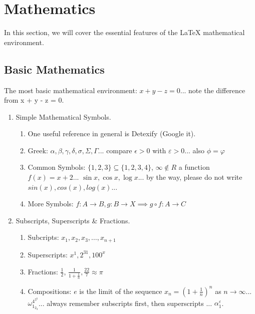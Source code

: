 \documentclass{article}
\begin{document}
    \section{Mathematics}
        In this section, we will cover the essential features of the \LaTeX{} mathematical environment.
        \subsection{Basic Mathematics}
            The most basic mathematical environment: $x + y - z = 0$... note the difference from x + y - z = 0.
            \begin{enumerate}
                \item Simple Mathematical Symbols.
                \begin{enumerate}
                    \item One useful reference in general is Detexify (Google it).
                    \item Greek: $\alpha, \beta, \gamma, \delta,\sigma, \Sigma, \Gamma$... compare $\epsilon > 0$ with $\varepsilon > 0$... also $\phi = \varphi$
                    \item Common Symbols: $\{1, 2, 3\} \subseteq \{1, 2, 3, 4\}$, $\infty \not \in R$ a function $f(x) = x + 2$... $\sin x, \cos x, \log x$... by the way, please do not write $sin(x), cos(x), log(x)$... 
                    \item More Symbols: $f: A \to B, g:B \to X \implies g \circ f : A \to C$
                \end{enumerate}
                \item Subscripts, Superscripts \& Fractions.
                \begin{enumerate}
                    \item Subcripts: $x_{1}, x_{2}, x_{3}, \dots , x_{n+1}$
                    \item Superscripts: $x^{1}, 2^{31}, 100^{x}$
                    \item Fractions: $\frac{1}{2}$, $\frac{1}{1 + \frac{1}{n}}, \frac{22}{7} \approx \pi$
                    \item Compositions: $e$ is the limit of the sequence $x_{n} = (1 + \frac{1}{n})^{n}$ as $n \to \infty$... $\omega_{1_{2_{3}}}^{4^{5^{6}}}$... always remember subscripts first, then superscripts ... $\alpha_{1}^{\varepsilon}$.
                \end{enumerate}

\end{enumerate}
\end{document}
